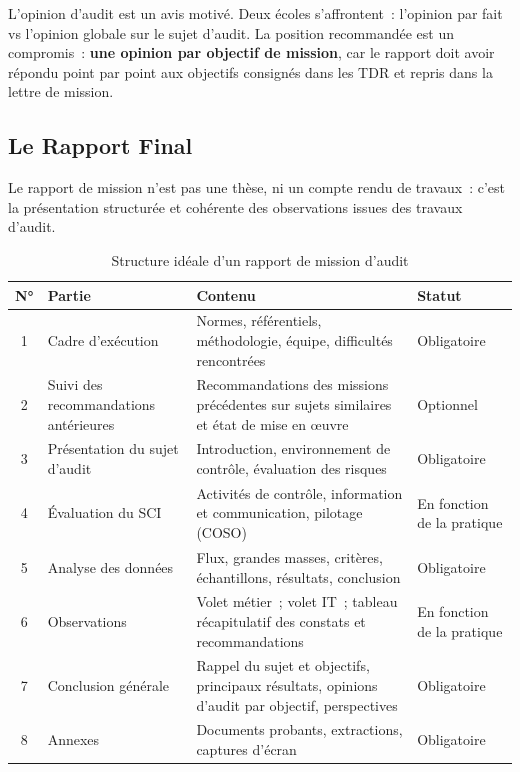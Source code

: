L'opinion d'audit est un avis motivé. Deux écoles s'affrontent~: l'opinion par fait
vs l'opinion globale sur le sujet d'audit. La position recommandée est un compromis~:
\textbf{une opinion par objectif de mission}, car le rapport doit avoir répondu point
par point aux objectifs consignés dans les TDR et repris dans la lettre de mission.

\subsection{Le Rapport Final}
\label{subsec:rapport-final}

Le rapport de mission n'est pas une thèse, ni un compte rendu de travaux~: c'est la
présentation structurée et cohérente des observations issues des travaux d'audit.

\begin{table}[H]
\centering
\small
\renewcommand{\arraystretch}{1.35}
\caption{Structure idéale d'un rapport de mission d'audit}
\label{tab:structure-rapport}
\begin{tabular}{|c|p{4.5cm}|p{5.5cm}|p{2.5cm}|}
    \hline
    \rowcolor{gray!20}
    \textbf{N°} & \textbf{Partie} & \textbf{Contenu} & \textbf{Statut} \\ \hline
    1 & Cadre d'exécution &
    Normes, référentiels, méthodologie, équipe,
    difficultés rencontrées &
    Obligatoire \\ \hline
    2 & Suivi des recommandations antérieures &
    Recommandations des missions précédentes sur
    sujets similaires et état de mise en œuvre &
    Optionnel \\ \hline
    3 & Présentation du sujet d'audit &
    Introduction, environnement de contrôle,
    évaluation des risques &
    Obligatoire \\ \hline
    4 & Évaluation du SCI &
    Activités de contrôle, information et communication,
    pilotage (COSO) &
    En fonction de la pratique \\ \hline
    5 & Analyse des données &
    Flux, grandes masses, critères, échantillons,
    résultats, conclusion &
    Obligatoire \\ \hline
    6 & Observations &
    Volet métier~; volet IT~;
    tableau récapitulatif des constats et recommandations &
    En fonction de la pratique \\ \hline
    7 & Conclusion générale &
    Rappel du sujet et objectifs, principaux résultats,
    opinions d'audit par objectif, perspectives &
    Obligatoire \\ \hline
    8 & Annexes &
    Documents probants, extractions, captures d'écran &
    Obligatoire \\ \hline
\end{tabular}
\end{table}

